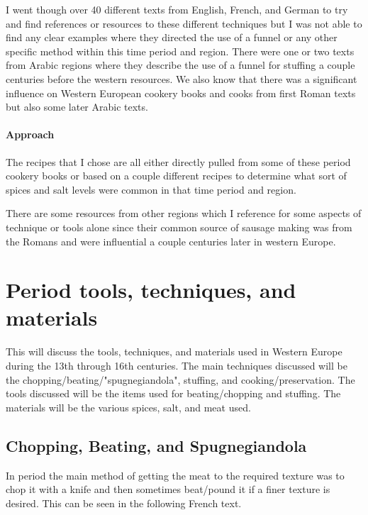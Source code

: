 \documentclass[letterpaper,11pt,leqno]{article}
\begin{document}
I went though over 40 different texts from English, French, and German to try and find references or resources to these different techniques but I was not able to find any clear examples where they directed the use of a funnel or any other specific method within this time period and region. There were one or two texts from Arabic regions where they describe the use of a funnel for stuffing a couple centuries before the western resources. We also know that there was a significant influence on Western European cookery books and cooks from first Roman texts but also some later Arabic texts.

\paragraph{Approach} 
The recipes that I chose are all either directly pulled from some of these period cookery books or based on a couple different recipes to determine what sort of spices and salt levels were common in that time period and region.

There are some resources from other regions which I reference for some aspects of technique or tools alone since their common source of sausage making was from the Romans and were influential a couple centuries later in western Europe. 


\section{Period tools, techniques, and materials}

This will discuss the tools, techniques, and materials used in Western Europe during the 13th through 16th centuries. The main techniques discussed will be the chopping/beating/"spugnegiandola", stuffing, and cooking/preservation. The tools discussed will be the items used for beating/chopping and stuffing. The materials will be the various spices, salt, and meat used.

\subsection{Chopping, Beating, and Spugnegiandola}

 In period the main method of getting the meat to the required texture was to chop it with a knife and then sometimes beat/pound it if a finer texture is desired. This can be seen in the following French text.
 
\end{document}
